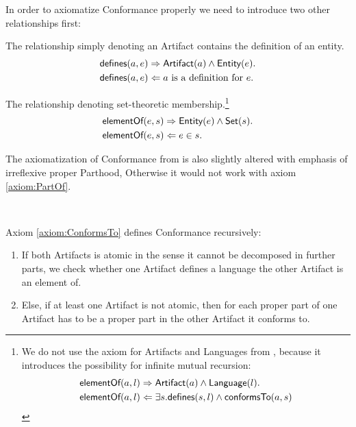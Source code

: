 In order to axiomatize \gls{Conformance} properly we need to introduce two other relationships first:
\begin{description}[align=left]
\item[\defines]
The relationship simply denoting an \gls{Artifact} contains the definition of an entity.
\begin{align*}
\textsf{defines}(a,e)
&\Rightarrow
\textsf{Artifact}(a) \wedge \textsf{Entity}(e).\\
\textsf{defines}(a,e)
&\Leftarrow
a \text{ is a definition for } e.
\end{align*}

\item[\elementOf]
The relationship denoting set-theoretic membership.\footnote{We do not use the \elementOf axiom for \glspl{Artifact} and \glspl{Language} from \cite{HeinzLV17}, because it introduces the possibility for infinite mutual recursion:
\begin{align*}
\textsf{elementOf}(a,l)
&\Rightarrow
\textsf{Artifact}(a) \wedge \textsf{Language}(l).\\
\textsf{elementOf}(a,l)
&\Leftarrow
\exists s.\textsf{defines}(s,l) \wedge \textsf{conformsTo}(a,s)
\end{align*}}
\begin{align*}
\textsf{elementOf}(e,s)
&\Rightarrow
\textsf{Entity}(e) \wedge \textsf{Set}(s).\\
\textsf{elementOf}(e,s)
&\Leftarrow
e \in s.
\end{align*}


\end{description}


The axiomatization of \gls{Conformance} from \cite{HeinzLV17} is also slightly altered with emphasis of irreflexive proper \gls{Parthood}, Otherwise it would not work with axiom \ref{axiom:PartOf}.
\begin{axiom}[\conformsTo]
\label{axiom:ConformsTo}
~\newline
{}
\end{axiom}
Axiom \ref{axiom:ConformsTo} defines \gls{Conformance} recursively:
\begin{enumerate}[align=left,label=\textbf{Case \Roman*},ref={\Roman*}]
\item
If both \glspl{Artifact} is atomic in the sense it cannot be decomposed in further parts, we check whether one \gls{Artifact} defines a language the other \gls{Artifact} is an element of.

\item
Else, if at least one \gls{Artifact} is not atomic, then for each proper part of one \gls{Artifact} has to be a proper part in the other \gls{Artifact} it conforms to.
\end{enumerate}



